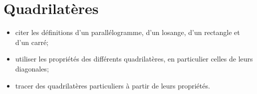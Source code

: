 \chapter{Quadrilatères}\label{ChQuadrilateres}

\begin{acquis} %
\begin{itemize}
\item citer les définitions d'un parallélogramme, d'un losange, d'un rectangle et d'un carré;
\item utiliser les propriétés des différents quadrilatères, en particulier celles de leurs diagonales;
\item tracer des quadrilatères particuliers à partir de leurs propriétés.
\end{itemize}
\end{acquis}

\activites



\cours


\exercicesbase
\begin{colonne*exercice}

\end{colonne*exercice}


\exercicesappr
\begin{colonne*exercice}

\end{colonne*exercice}

\connaissances


\TravauxPratiques %


\pagebreak

\recreation



